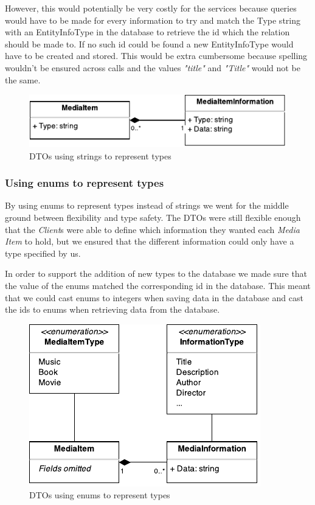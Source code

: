 \documentclass[../report.tex]{subfiles}
\begin{document}
However, this would potentially be very costly for the services because queries would have to be made for every information to try and match the Type string with an EntityInfoType in the database to retrieve the id which the relation should be made to. If no such id could be found a new EntityInfoType would have to be created and stored. This would be extra cumbersome because spelling wouldn't be ensured across calls and the values \textit{"title"} and \textit{"Title"} would not be the same.
 
\begin{figure}[!h]
\label{fig:dto_types_string}
\centering
\includegraphics[scale=0.7]{../img/typesAsString.pdf}
\caption{DTOs using strings to represent types}
\end{figure}

\subsubsection{Using enums to represent types}
By using enums to represent types instead of strings we went for the middle ground between flexibility and type safety. The DTOs were still flexible enough that the \textit{Client}s were able to define which information they wanted each \textit{Media Item} to hold, but we ensured that the different information could only have a type specified by us.

In order to support the addition of new types to the database we made sure that the value of the enums matched the corresponding id in the database. This meant that we could cast enums to integers when saving data in the database and cast the ids to enums when retrieving data from the database. 

\begin{figure}[!h]
\label{fig:dto_types_enum}
\centering
\includegraphics[scale=0.7]{../img/typesAsEnum.pdf}
\caption{DTOs using enums to represent types}
\end{figure}
\end{document}
